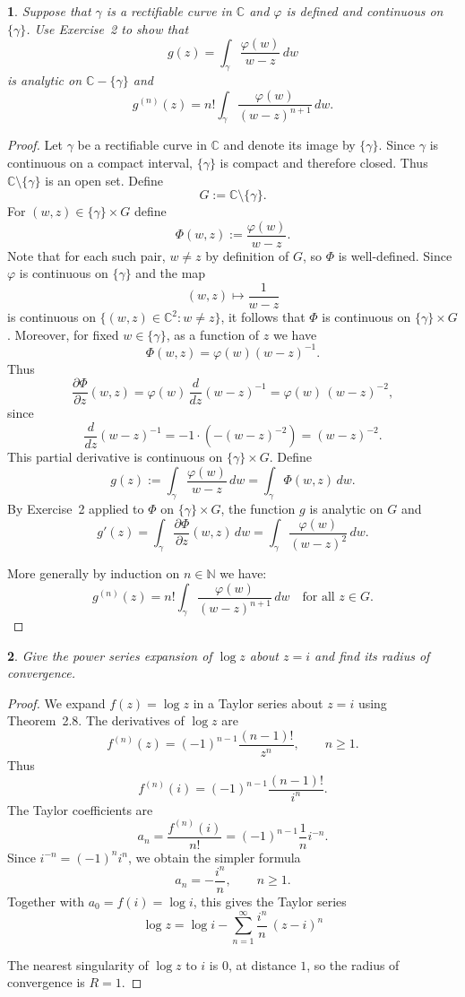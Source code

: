 \documentclass[12pt, a4paper]{report}
\theoremstyle{spaced}
\newtheorem{exercise}{}
\newcommand{\setexercise}[1]{\setcounter{exercise}{#1-1}}
\begin{document}
\setexercise{3}
\begin{exercise}
	Suppose that $\gamma$ is a rectifiable curve in $\mathbb{C}$ and $\varphi$ is defined and continuous on $\{\gamma\}$.
	Use Exercise~2 to show that
	\[
		g(z) = \int_{\gamma} \frac{\varphi(w)}{w - z}\, dw
	\]
	is analytic on $\mathbb{C} - \{\gamma\}$ and
	\[
		g^{(n)}(z) = n! \int_{\gamma} \frac{\varphi(w)}{(w-z)^{n+1}}\, dw.
	\]
\end{exercise}

\begin{proof}
	Let $\gamma$ be a rectifiable curve in $\mathbb{C}$ and denote its image by $\{\gamma\}$.
	Since $\gamma$ is continuous on a compact interval, $\{\gamma\}$ is compact and therefore closed.
	Thus $\mathbb{C} \setminus \{\gamma\}$ is an open set.
	Define
	\[
		G := \mathbb{C} \setminus \{\gamma\}.
	\]
	For $(w,z) \in \{\gamma\} \times G$ define
	\[
		\Phi(w,z) := \frac{\varphi(w)}{w - z}.
	\]
	Note that for each such pair, $w \neq z$ by definition of $G$, so $\Phi$ is well-defined.
	Since $\varphi$ is continuous on $\{\gamma\}$ and the map
	\[
		(w,z) \mapsto \frac{1}{w-z}
	\]
	is continuous on $\{(w,z)\in\mathbb{C}^2 : w\neq z\}$, it follows that $\Phi$ is continuous on
	$\{\gamma\} \times G$.
	Moreover, for fixed $w\in\{\gamma\}$, as a function of $z$ we have
	\[
		\Phi(w,z) = \varphi(w)(w-z)^{-1}.
	\]
	Thus
	\[
		\frac{\partial \Phi}{\partial z}(w,z)
		= \varphi(w)\,\frac{d}{dz}(w-z)^{-1}
		= \varphi(w)\,(w-z)^{-2},
	\]
	since
	\[
		\frac{d}{dz}(w-z)^{-1}
		= -1\cdot(-(w-z)^{-2}) = (w-z)^{-2}.
	\]
	This partial derivative is continuous on $\{\gamma\}\times G$.
	Define
	\[
		g(z) := \int_\gamma \frac{\varphi(w)}{w-z}\,dw
		= \int_\gamma \Phi(w,z)\,dw.
	\]
	By Exercise~2 applied to $\Phi$ on $\{\gamma\}\times G$, the function $g$ is analytic on $G$
	and
	\[
		g'(z) = \int_\gamma \frac{\partial \Phi}{\partial z}(w,z)\,dw
		= \int_\gamma \frac{\varphi(w)}{(w-z)^2}\,dw.
	\]

	More generally by induction on $n\in\mathbb{N}$ we have:
	\[
		g^{(n)}(z) = n!\int_\gamma \frac{\varphi(w)}{(w-z)^{n+1}}\,dw
		\quad\text{for all }z\in G.
	\]
\end{proof}


\setexercise{5}
\begin{exercise}
	Give the power series expansion of $\log z$ about $z=i$ and find its radius of convergence.
\end{exercise}

\begin{proof}
	We expand $f(z)=\log z$ in a Taylor series about $z=i$ using Theorem~2.8.
	The derivatives of $\log z$ are
	\[
		f^{(n)}(z)=(-1)^{n-1}\frac{(n-1)!}{z^{n}}, \qquad n\ge 1.
	\]
	Thus
	\[
		f^{(n)}(i)
		= (-1)^{n-1}\frac{(n-1)!}{i^{n}}.
	\]
	The Taylor coefficients are
	\[
		a_n = \frac{f^{(n)}(i)}{n!}
		= (-1)^{n-1}\frac{1}{n}i^{-n}.
	\]
	Since $i^{-n}=(-1)^n i^n$, we obtain the simpler formula
	\[
		a_n = -\frac{i^n}{n}, \qquad n\ge 1.
	\]
	Together with $a_0=f(i)=\log i$, this gives the Taylor series
	\[
		\log z
		= \log i
		- \sum_{n=1}^{\infty} \frac{i^n}{n}\,(z-i)^n
	\]

	\noindent	The nearest singularity of $\log z$ to $i$ is $0$, at distance $1$,
	so the radius of convergence is
	$R=1$.
\end{proof}
\end{document}
